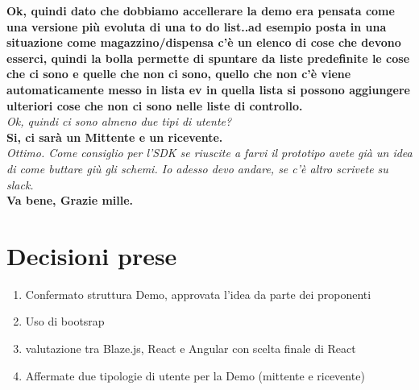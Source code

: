 \documentclass[10 pt,a4paper, openany]{article}
\begin{document}
\textbf{Ok, quindi dato che dobbiamo accellerare la demo era pensata come una versione più evoluta di una to do list..ad esempio posta in una situazione come magazzino/dispensa c'è un elenco di cose che devono esserci, quindi la bolla permette di spuntare da liste predefinite le cose che ci sono e quelle che non ci sono, quello che non c'è viene automaticamente messo in lista ev in quella lista si possono aggiungere ulteriori cose che non ci sono nelle liste di controllo.}\\
\textit{Ok, quindi ci sono almeno due tipi di utente?}\\

\textbf{Si, ci sarà un Mittente e un ricevente.}\\
\textit{Ottimo. Come consiglio per l'SDK se riuscite a farvi il prototipo avete già un idea di come buttare giù gli schemi. Io adesso devo andare, se c'è altro scrivete su slack.}\\

\textbf{Va bene, Grazie mille.}\\

\section{Decisioni prese}
\begin{enumerate}
	\item Confermato struttura Demo, approvata l'idea da parte dei proponenti
	\item Uso di bootsrap
	\item valutazione tra Blaze.js, React e Angular con scelta finale di React
	\item Affermate due tipologie di utente per la Demo (mittente e ricevente)
	
\end{enumerate}
\end{document}
